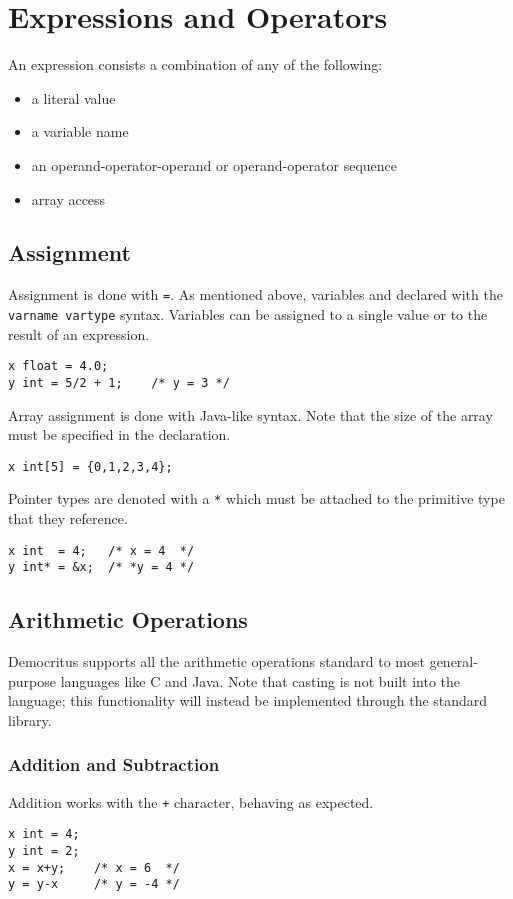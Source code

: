 \chapter{Expressions and Operators}
	An expression consists a combination of any of the following:
    \begin{itemize}
        \item a literal value
        \item a variable name
        \item an operand-operator-operand or operand-operator sequence
        \item array access 
    \end{itemize}
    \section{Assignment}
		Assignment is done with \texttt{=}. As mentioned above, variables and declared with the \texttt{varname vartype} syntax. Variables can be assigned to a single value or to the result of an expression. 
		
		\begin{lstlisting}
x float = 4.0;
y int = 5/2 + 1; 	/* y = 3 */
		\end{lstlisting}
		
		\noindent Array assignment is done with Java-like syntax. Note that the size of the array must be specified in the declaration. 
		
		\begin{lstlisting}
x int[5] = {0,1,2,3,4};
		\end{lstlisting}
		
		\noindent Pointer types are denoted with a \texttt{*} which must be attached to the primitive type that they reference.
		
		\begin{lstlisting}
x int  = 4;   /* x = 4  */
y int* = &x;  /* *y = 4 */
		\end{lstlisting}
		
	\section{Arithmetic Operations}
		Democritus supports all the arithmetic operations standard to most general-purpose languages like C and Java. Note that casting is not built into the language; this functionality will instead be implemented through the standard library.
		
		\subsection{Addition and Subtraction}
			Addition works with the \texttt{+} character, behaving as expected.
			\begin{lstlisting}
x int = 4;
y int = 2;
x = x+y; 	/* x = 6  */
y = y-x 	/* y = -4 */
			\end{lstlisting}
						
